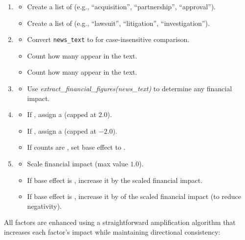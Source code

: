 \documentclass[3p,times,procedia]{elsarticle}
\begin{document}
\begin{enumerate}
    \item {}
    \begin{itemize}
        \item Create a list of  (e.g., ``acquisition'', ``partnership'', ``approval'').
        \item Create a list of  (e.g., \allowbreak``lawsuit'', ``litigation'', ``investigation'').
    \end{itemize}

    \item {}
    \begin{itemize}
        \item Convert \texttt{news\_text} to  for case-insensitive comparison.
        \item Count how many  appear in the text.
        \item Count how many  appear in the text.
    \end{itemize}

    \item {}
    \begin{itemize}
        \item Use \textit{extract\_financial\_figures(news\_text)} to determine any financial impact.
    \end{itemize}

    \item {}
    \begin{itemize}
        \item If , assign a  (capped at $2.0$).
        \item If , assign a  (capped at $-2.0$).
        \item If counts are , set base effect to .
    \end{itemize}

    \item {}
    \begin{itemize}
        \item Scale financial impact (max value $1.0$).
        \item If base effect is , increase it by the scaled financial impact.
        \item If base effect is , increase it by  of the scaled financial impact (to reduce negativity).
    \end{itemize}

\end{enumerate}
All factors are enhanced using a straightforward amplification algorithm \cite{Harvey2016} that increases each factor's impact while maintaining directional consistency:
\end{document}
